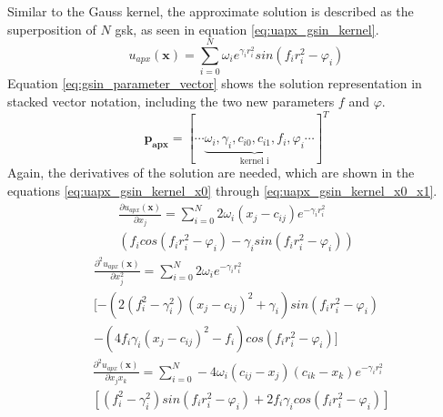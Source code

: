 \documentclass[./\jobname.tex]{subfiles}
\begin{document}
Similar to the Gauss kernel, the approximate solution is described as the superposition of $N$ \gls{gsk}, as seen in equation \eqref{eq:uapx_gsin_kernel}. 
\begin{equation}
\label{eq:uapx_gsin_kernel}
u_{apx}(\mathbf{x}) = \sum_{i=0}^{N} \omega_i e^{\gamma_i r_i^2} sin(f_i r_i^2 - \varphi_i)
\end{equation}
Equation \eqref{eq:gsin_parameter_vector} shows the solution representation in stacked vector notation, including the two new parameters $f$ and $\varphi$. 
\begin{equation}
\label{eq:gsin_parameter_vector}
\mathbf{p_{apx}} = \left[\cdots \underbrace{\omega_i, \gamma_i, c_{i0}, c_{i1}, f_i, \varphi_i}_{\text{kernel i}}\cdots\right]^T
\end{equation}
Again, the derivatives of the solution are needed, which are shown in the equations \eqref{eq:uapx_gsin_kernel_x0} through \eqref{eq:uapx_gsin_kernel_x0_x1}. 
\begin{equation}
\label{eq:uapx_gsin_kernel_x0}
\begin{split}
\frac{\partial u_{apx}(\mathbf{x})}{\partial x_j} = \sum_{i=0}^{N} 2 \omega_i (x_j - c_{ij}) e^{-\gamma_i r_i^2}\\ (f_i cos(f_i r_i^2 - \varphi_i)-\gamma_i sin(f_i r_i^2 - \varphi_i))
\end{split}
\end{equation}
\begin{equation}
\label{eq:uapx_gsin_kernel_x0_x0}
\begin{split}
\frac{\partial^2 u_{apx}(\mathbf{x})}{\partial x_j^2} = \sum_{i=0}^{N} 2 \omega_i e^{-\gamma_i r_i^2} \\ [  -(2(f_i^2 - \gamma_i^2) (x_j-c_{ij})^2 + \gamma_i) sin(f_i r_i^2 - \varphi_i) \\ -  (4 f_i \gamma_i (x_j-c_{ij})^2 -f_i) cos(f_i r_i^2 - \varphi_i) ] 
\end{split}
\end{equation}
\begin{equation}
\label{eq:uapx_gsin_kernel_x0_x1}
\begin{split}
& \frac{\partial^2 u_{apx}(\mathbf{x})}{\partial x_j x_k} = \sum_{i=0}^{N} -4 \omega_i (c_{ij} - x_j) (c_{ik} - x_k) e^{-\gamma_i r_i^2} \\ & \left[(f_i^2 - \gamma_i^2) sin(f_i r_i^2 - \varphi_i) + 2 f_i \gamma_i cos(f_i r_i^2 - \varphi_i)\right]
\end{split}
\end{equation}
\end{document}
